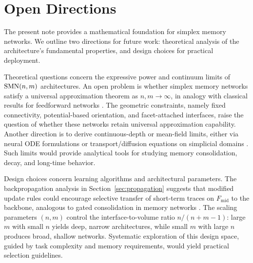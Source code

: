 \section{Open Directions}
\label{sec:open}

The present note provides a mathematical foundation for simplex memory networks. We outline two directions for future work: theoretical analysis of the architecture's fundamental properties, and design choices for practical deployment.

Theoretical questions concern the expressive power and continuum limits of $\mathrm{SMN}(n,m)$ architectures. An open problem is whether simplex memory networks satisfy a universal approximation theorem as $n,m \to \infty$, in analogy with classical results for feedforward networks \cite{Cybenko1989,HornikStinchcombeWhite1989}. The geometric constraints, namely fixed connectivity, potential-based orientation, and facet-attached interfaces, raise the question of whether these networks retain universal approximation capability. Another direction is to derive continuous-depth or mean-field limits, either via neural ODE formulations \cite{ChenRubanovaBettencourtDuvenaud2018} or transport/diffusion equations on simplicial domains \cite{EinizadeThanouMalliarosGiraldo2025}. Such limits would provide analytical tools for studying memory consolidation, decay, and long-time behavior.

Design choices concern learning algorithms and architectural parameters. The backpropagation analysis in Section~\ref{sec:propagation} suggests that modified update rules could encourage selective transfer of short-term traces on $F_{\mathrm{mid}}$ to the backbone, analogous to gated consolidation in memory networks \cite{HochreiterSchmidhuber1997}. The scaling parameters $(n,m)$ control the interface-to-volume ratio $n/(n+m-1)$: large $m$ with small $n$ yields deep, narrow architectures, while small $m$ with large $n$ produces broad, shallow networks. Systematic exploration of this design space, guided by task complexity and memory requirements, would yield practical selection guidelines.

